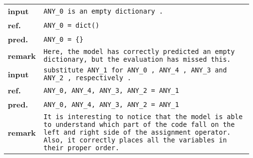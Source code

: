\documentclass{article}
\begin{document}
  \begin{tabular}{ l p{}}
    \hline
    \textbf{input} & \texttt{ANY\_0 is an empty dictionary .} \\
    \textbf{ref.}  & \texttt{ANY\_0 = dict()} \\
    \textbf{pred.} & \texttt{ANY\_0 = \{\}} \\
    \textbf{remark}& \texttt{Here, the model has correctly predicted an empty dictionary, but
                     the evaluation has missed this. } \\
    \hline
    \textbf{input} & \texttt{substitute ANY\_1 for ANY\_0 , ANY\_4 , ANY\_3 and ANY\_2 , 
                     respectively .} \\
    \textbf{ref.}  & \texttt{ANY\_0, ANY\_4, ANY\_3, ANY\_2 = ANY\_1} \\
    \textbf{pred.} & \texttt{ANY\_0, ANY\_4, ANY\_3, ANY\_2 = ANY\_1} \\
    \textbf{remark}& \texttt{It is interesting to notice that the model is able to understand
                     which part of the code fall on the left and right side of the assignment
                     operator. Also, it correctly places all the variables in their 
                     proper order. } \\
    \hline
  \end{tabular}
\end{document}

